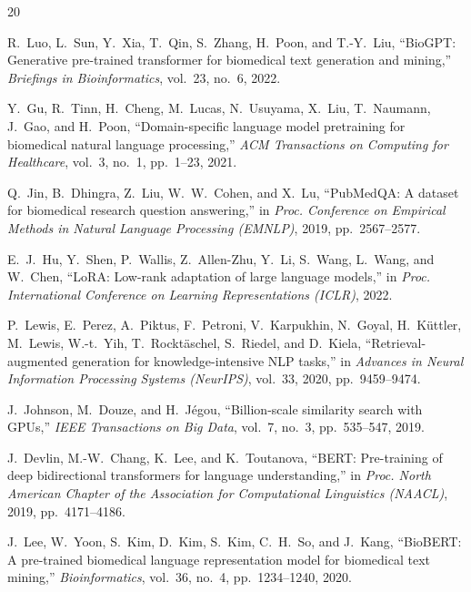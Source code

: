\documentclass[conference]{IEEEtran}
\begin{document}


\begin{thebibliography}{20}

R.~Luo, L.~Sun, Y.~Xia, T.~Qin, S.~Zhang, H.~Poon, and T.-Y.~Liu,
``BioGPT: Generative pre-trained transformer for biomedical text generation and mining,''
\textit{Briefings in Bioinformatics}, vol.~23, no.~6, 2022.

Y.~Gu, R.~Tinn, H.~Cheng, M.~Lucas, N.~Usuyama, X.~Liu, T.~Naumann, J.~Gao, and H.~Poon,
``Domain-specific language model pretraining for biomedical natural language processing,''
\textit{ACM Transactions on Computing for Healthcare}, vol.~3, no.~1, pp.~1--23, 2021.

Q.~Jin, B.~Dhingra, Z.~Liu, W.~W.~Cohen, and X.~Lu,
``PubMedQA: A dataset for biomedical research question answering,''
in \textit{Proc. Conference on Empirical Methods in Natural Language Processing (EMNLP)}, 2019, pp.~2567--2577.

E.~J.~Hu, Y.~Shen, P.~Wallis, Z.~Allen-Zhu, Y.~Li, S.~Wang, L.~Wang, and W.~Chen,
``LoRA: Low-rank adaptation of large language models,''
in \textit{Proc. International Conference on Learning Representations (ICLR)}, 2022.

P.~Lewis, E.~Perez, A.~Piktus, F.~Petroni, V.~Karpukhin, N.~Goyal, H.~K\"{u}ttler, M.~Lewis, W.-t.~Yih, T.~Rockt\"{a}schel, S.~Riedel, and D.~Kiela,
``Retrieval-augmented generation for knowledge-intensive NLP tasks,''
in \textit{Advances in Neural Information Processing Systems (NeurIPS)}, vol.~33, 2020, pp.~9459--9474.

J.~Johnson, M.~Douze, and H.~J\'{e}gou,
``Billion-scale similarity search with GPUs,''
\textit{IEEE Transactions on Big Data}, vol.~7, no.~3, pp.~535--547, 2019.

J.~Devlin, M.-W.~Chang, K.~Lee, and K.~Toutanova,
``BERT: Pre-training of deep bidirectional transformers for language understanding,''
in \textit{Proc. North American Chapter of the Association for Computational Linguistics (NAACL)}, 2019, pp.~4171--4186.

J.~Lee, W.~Yoon, S.~Kim, D.~Kim, S.~Kim, C.~H.~So, and J.~Kang,
``BioBERT: A pre-trained biomedical language representation model for biomedical text mining,''
\textit{Bioinformatics}, vol.~36, no.~4, pp.~1234--1240, 2020.


\end{thebibliography}
\end{document}
